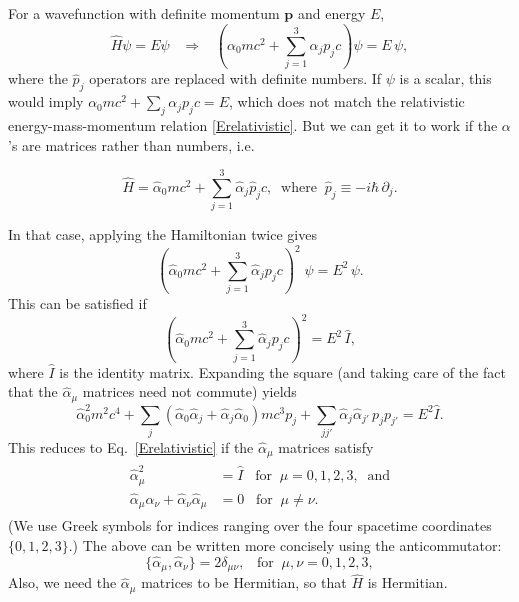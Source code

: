 \documentclass[pra,12pt]{revtex4}
\begin{document}
For a wavefunction with definite momentum $\mathbf{p}$ and energy
$E$,
\begin{equation}
  \hat{H}\psi = E \psi \;\;\;\Rightarrow \;\;\;
  \left(\alpha_0mc^2 + \sum_{j=1}^3\alpha_j p_jc\right) \psi = E\,\psi,
\end{equation}
where the $\hat{p}_j$ operators are replaced with definite numbers.
If $\psi$ is a scalar, this would imply $\alpha_0 mc^2 +
\sum_{j}\alpha_j p_j c = E$, which does not match the relativistic
energy-mass-momentum relation \eqref{Erelativistic}.  But we can get
it to work if the $\alpha$'s are matrices rather than numbers, i.e.
\begin{framed}
  \begin{equation}
    \hat{H} = \hat{\alpha}_0 mc^2 + \sum_{j=1}^3 \hat{\alpha}_j \hat{p}_j c,
    \;\; \mathrm{where}\;\; \hat{p}_j \equiv -i\hbar\, \partial_j.
    \label{Dirac}
  \end{equation}
\end{framed}
\vskip -0.15in
\noindent
In that case, applying the Hamiltonian twice gives
\begin{equation}
  \left(\hat{\alpha}_0mc^2 + \sum_{j=1}^3\hat{\alpha}_j p_j c\right)^{\!2}\;
  \psi = E^2\,\psi.
\end{equation}
This can be satisfied if
\begin{equation}
  \left(\hat{\alpha}_0 mc^2 + \sum_{j=1}^3\hat{\alpha}_j p_j c\right)^2
  = E^2\, \hat{I},
\end{equation}
where $\hat{I}$ is the identity matrix.  Expanding the square (and
taking care of the fact that the $\hat{\alpha}_\mu$ matrices need not
commute) yields
\begin{equation}
  \hat{\alpha}_0^2 m^2c^4
  + \sum_j \left(\hat{\alpha}_0 \hat{\alpha}_j + \hat{\alpha}_j \hat{\alpha}_0\right) mc^3 p_j
  + \sum_{jj'} \hat{\alpha}_j \hat{\alpha}_{j'} \, p_j p_{j'} = E^2\hat{I}.
\end{equation}
This reduces to Eq.~\eqref{Erelativistic} if the $\hat{\alpha}_\mu$
matrices satisfy
\begin{align}
  \begin{aligned}
    \hat{\alpha}_\mu^2 &= \hat{I} \;\;\; \textrm{for} \;\;\mu=0,1,2,3,
    \;\;\textrm{and} \\
    \hat{\alpha}_\mu \hat{\alpha}_\nu
    + \hat{\alpha}_\nu \hat{\alpha}_\mu &= 0
    \;\;\; \textrm{for} \;\;\mu \ne \nu.
  \end{aligned}
\end{align}
(We use Greek symbols for indices ranging over the four spacetime
coordinates $\{0,1,2,3\}$.)  The above can be written more concisely
using the anticommutator:
\begin{equation}
  \{\hat{\alpha}_\mu, \hat{\alpha}_\nu\} = 2\delta_{\mu\nu},
  \;\;\; \textrm{for} \;\;\mu,\nu=0,1,2,3,
  \label{Dirac_anticomm}
\end{equation}
Also, we need the $\hat{\alpha}_\mu$ matrices to be Hermitian, so that
$\hat{H}$ is Hermitian.
\end{document}

